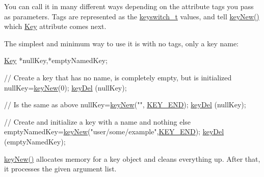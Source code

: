 You can call it in many different ways depending on the attribute tags you pass as parameters. Tags are represented as the \hyperlink{group__key_ga91fb3178848bd682000958089abbaf40}{keyswitch\-\_\-t} values, and tell \hyperlink{group__key_gaf6893c038b3ebee90c73a9ea8356bebf}{key\-New()} which \hyperlink{classkdb_1_1Key}{Key} attribute comes next.

The simplest and minimum way to use it is with no tags, only a key name\-: 
\begin{DoxyCode}
\hyperlink{classkdb_1_1Key_a5679f5cae63caddd64a60388b9cc77fa}{Key} *nullKey,*emptyNamedKey;

\textcolor{comment}{// Create a key that has no name, is completely empty, but is initialized}
nullKey=\hyperlink{group__key_gaf6893c038b3ebee90c73a9ea8356bebf}{keyNew}(0);
\hyperlink{group__key_ga3df95bbc2494e3e6703ece5639be5bb1}{keyDel} (nullKey);

\textcolor{comment}{// Is the same as above}
nullKey=\hyperlink{group__key_gaf6893c038b3ebee90c73a9ea8356bebf}{keyNew}(\textcolor{stringliteral}{""}, \hyperlink{group__key_gga91fb3178848bd682000958089abbaf40aa8adb6fcb92dec58fb19410eacfdd403}{KEY\_END});
\hyperlink{group__key_ga3df95bbc2494e3e6703ece5639be5bb1}{keyDel} (nullKey);

\textcolor{comment}{// Create and initialize a key with a name and nothing else}
emptyNamedKey=\hyperlink{group__key_gaf6893c038b3ebee90c73a9ea8356bebf}{keyNew}(\textcolor{stringliteral}{"user/some/example"},\hyperlink{group__key_gga91fb3178848bd682000958089abbaf40aa8adb6fcb92dec58fb19410eacfdd403}{KEY\_END});
\hyperlink{group__key_ga3df95bbc2494e3e6703ece5639be5bb1}{keyDel} (emptyNamedKey);
\end{DoxyCode}


\hyperlink{group__key_gaf6893c038b3ebee90c73a9ea8356bebf}{key\-New()} allocates memory for a key object and cleans everything up. After that, it processes the given argument list.

